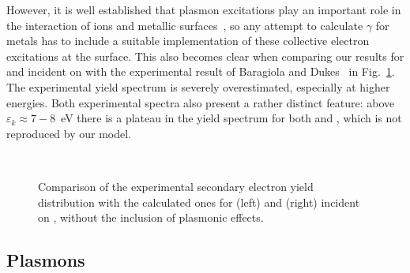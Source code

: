 \begin{refsection}
However, it is well established that plasmon excitations play an important 
role in the interaction of ions and metallic surfaces~\cite{Baragiola1996, 
Baragiola2001, Baragiola2007}, so any attempt to calculate $\gamma$ for metals 
has to include a suitable implementation of these collective electron excitations at
the surface. This also becomes clear when comparing our results 
for  and  incident on  with the experimental 
result of Baragiola and Dukes~\cite{Baragiola1996} in 
Fig.~\ref{quotas:fig-he_mg_noplasmon}. The experimental yield spectrum is 
severely overestimated, especially at higher energies. Both experimental 
spectra also present a rather distinct feature: above $\varepsilon_k \approx 
7-8$~\si{\electronvolt} there is a plateau in the yield spectrum for both 
 and , which is not reproduced by our model. 

\begin{figure}[ht] 
    \centering 
    \begin{subfigure}[t]{0.49\textwidth} 
        \centering 
         
        \vspace{-1em} 
        \caption{} 
    \end{subfigure}%
    ~  
    \begin{subfigure}[t]{0.49\textwidth} 
        \centering 
         
        \vspace{-1em} 
        \caption{} 
    \end{subfigure} 
\caption{Comparison of the experimental secondary electron yield distribution 
with the calculated ones for  (left) and  (right) incident on 
, without the inclusion of plasmonic effects.} 
\label{quotas:fig-he_mg_noplasmon} 
\end{figure} 
 
\subsection{Plasmons} \label{quotas:sec-plasmons} 
 

\end{refsection}
